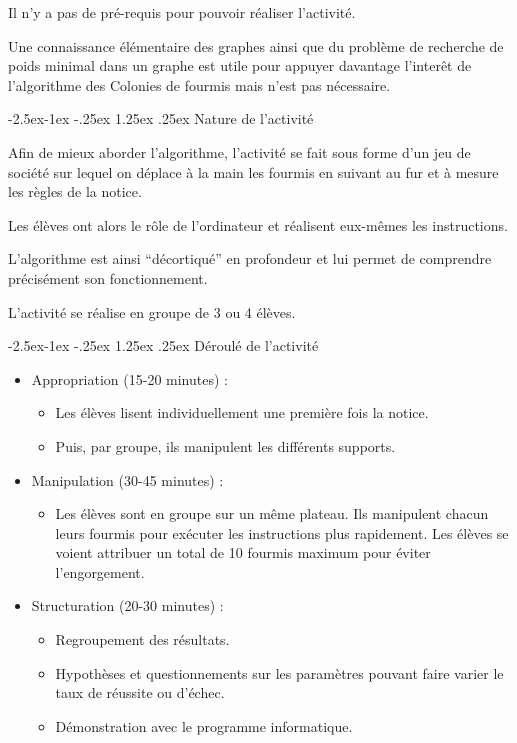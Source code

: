 \documentclass[
12pt,
french,
]{article}
\makeatletter
\providecommand{\tightlist}{%
\setlength{\itemsep}{0pt}\setlength{\parskip}{0pt}}
\renewcommand\paragraph{\@startsection{paragraph}{4}{\z@}%
        {-2.5ex\@plus -1ex \@minus -.25ex}%
        {1.25ex \@plus .25ex}%
        {\normalfont\normalsize\bfseries}}
\makeatother
\begin{document}
Il n'y a pas de pré-requis pour pouvoir réaliser l'activité.

Une connaissance élémentaire des graphes ainsi que du problème de
recherche de poids minimal dans un graphe est utile pour appuyer
davantage l'interêt de l'algorithme des Colonies de fourmis mais n'est
pas nécessaire.

\hypertarget{nature-de-lactivituxe9}{%
\paragraph{Nature de l'activité}\label{nature-de-lactivituxe9}}

Afin de mieux aborder l'algorithme, l'activité se fait sous forme d'un
jeu de société sur lequel on déplace à la main les fourmis en suivant au
fur et à mesure les règles de la notice.

Les élèves ont alors le rôle de l'ordinateur et réalisent eux-mêmes les
instructions.

L'algorithme est ainsi ``décortiqué'' en profondeur et lui permet de
comprendre précisément son fonctionnement.

L'activité se réalise en groupe de 3 ou 4 élèves.

\hypertarget{duxe9rouluxe9-de-lactivituxe9}{%
\paragraph{Déroulé de l'activité}\label{duxe9rouluxe9-de-lactivituxe9}}

\begin{itemize}
\item
  Appropriation (15-20 minutes) :

  \begin{itemize}
  \item
    Les élèves lisent individuellement une première fois la notice.
  \item
    Puis, par groupe, ils manipulent les différents supports.
  \end{itemize}
\item
  Manipulation (30-45 minutes) :

  \begin{itemize}
  \tightlist
  \item
    Les élèves sont en groupe sur un même plateau. Ils manipulent chacun
    leurs fourmis pour exécuter les instructions plus rapidement. Les
    élèves se voient attribuer un total de 10 fourmis maximum pour
    éviter l'engorgement.
  \end{itemize}
\item
  Structuration (20-30 minutes) :

  \begin{itemize}
  \item
    Regroupement des résultats.
  \item
    Hypothèses et questionnements sur les paramètres pouvant faire
    varier le taux de réussite ou d'échec.
  \item
    Démonstration avec le programme informatique.
  \end{itemize}
\end{itemize}
\end{document}
